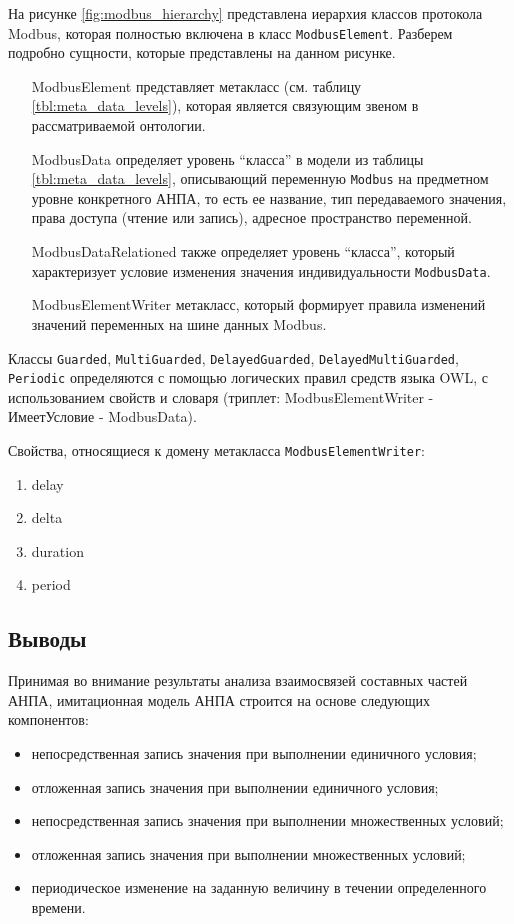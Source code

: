 На рисунке \ref{fig:modbus_hierarchy} представлена иерархия классов протокола Modbus,
которая полностью включена в класс \texttt{ModbusElement}.
Разберем подробно сущности, которые представлены на данном рисунке.
\begin{itemize}
    \item [ModbusElement] представляет метакласс (см. таблицу \ref{tbl:meta_data_levels}),
            которая является связующим звеном в рассматриваемой онтологии.
    \item [ModbusData] определяет уровень ``класса'' в модели из таблицы \ref{tbl:meta_data_levels},
            описывающий переменную \texttt{Modbus} на предметном уровне конкретного АНПА,
            то есть ее название, тип передаваемого значения, права доступа (чтение или запись),
            адресное пространство переменной.
    \item [ModbusDataRelationed] также определяет уровень ``класса'', который характеризует условие изменения значения
            индивидуальности \texttt{ModbusData}.
    \item [ModbusElementWriter] метакласс, который формирует правила изменений значений переменных на шине данных Modbus.
\end{itemize}

Классы \texttt{Guarded}, \texttt{MultiGuarded}, \texttt{DelayedGuarded}, \texttt{DelayedMultiGuarded}, \texttt{Periodic}
определяются с помощью логических правил средств языка OWL, с использованием свойств и словаря (триплет: ModbusElementWriter - ИмеетУсловие - ModbusData).

Свойства, относящиеся к домену метакласса \texttt{ModbusElementWriter}:
\begin{enumerate}
    \item delay
    \item delta
    \item duration
    \item period
\end{enumerate}



\subsection*{Выводы}
Принимая во внимание результаты анализа взаимосвязей составных частей АНПА,
имитационная модель АНПА строится на основе следующих компонентов:
\begin{itemize}
    \item непосредственная запись значения при выполнении единичного условия;
    \item отложенная запись значения при выполнении единичного условия;
    \item непосредственная запись значения при выполнении множественных условий;
    \item отложенная запись значения при выполнении множественных условий;
    \item периодическое изменение на заданную величину в течении определенного времени.
\end{itemize}

